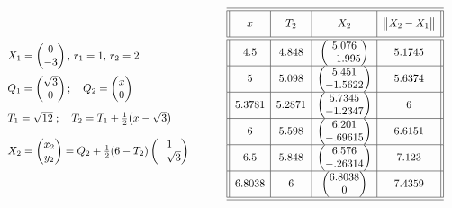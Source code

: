 \documentclass[12pt]{article}
\begin{document}
\[
\begin{array}{ll}
\begin{array}{l}
X_1=\begin{pmatrix} 0 \\ -3 \end{pmatrix},\,r_1=1,\,r_2=2 \\[12pt]
Q_1=\begin{pmatrix} \sqrt{3} \\ 0\end{pmatrix};\quad 
Q_2=\begin{pmatrix} x \\ 0\end{pmatrix}\\[15pt]
T_1=\sqrt{12}\;;\quad T_2= T_1+\frac{1}{2}\bigl(x-\sqrt{3}\bigr)
 \\[12pt]
X_2=\begin{pmatrix} x_2 \\ y_2\end{pmatrix} = Q_2+
\frac{1}{2}(6-T_2)\begin{pmatrix} 1 \\ -\sqrt{3} \end{pmatrix} 
\end{array}
\qquad
&
\begin{array}{||c|c|c|c||}
\hline\hline
\vphantom{\biggl\{\biggr\}}x & T_2 & X_2 & \bigl\|X_2-X_1\bigr\|\\\hline\hline
4.5 & 4.848 & \begin{pmatrix} 5.076 \\ -1.995\end{pmatrix}& 5.1745 \\\hline
5  & 5.098 & \begin{pmatrix} 5.451 \\ -1.5622\end{pmatrix} & 5.6374\\\hline
5.3781 & 5.2871 & \begin{pmatrix} 5.7345 \\ -1.2347\end{pmatrix} & 6\\\hline
6  & 5.598 & \begin{pmatrix} 6.201 \\ -.69615\end{pmatrix} & 6.6151\\\hline
6.5  & 5.848 & \begin{pmatrix} 6.576 \\ -.26314\end{pmatrix} & 7.123\\\hline
6.8038 & 6 & \begin{pmatrix} 6.8038 \\ 0\end{pmatrix} & 7.4359
\\
\hline\hline
\end{array}
\end{array}
\]
\end{document}
